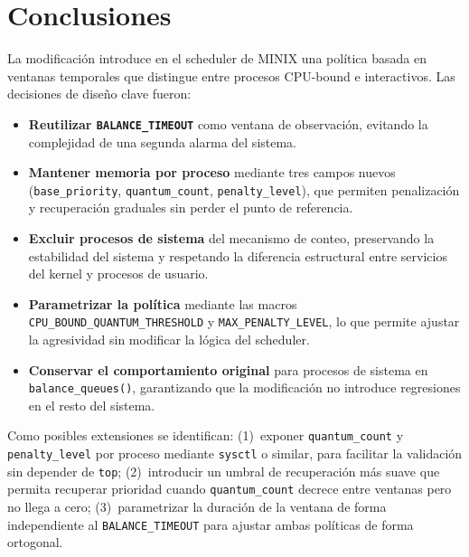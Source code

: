 \documentclass[11pt,a4paper]{article}
\begin{document}
\section{Conclusiones}

La modificaci\'on introduce en el scheduler de MINIX una pol\'itica basada en ventanas
temporales que distingue entre procesos CPU-bound e interactivos. Las decisiones de
dise\~no clave fueron:

\begin{itemize}[leftmargin=*]
  \item \textbf{Reutilizar \texttt{BALANCE\_TIMEOUT}} como ventana de observaci\'on,
        evitando la complejidad de una segunda alarma del sistema.

  \item \textbf{Mantener memoria por proceso} mediante tres campos nuevos
        (\texttt{base\_priority}, \texttt{quantum\_count}, \texttt{penalty\_level}),
        que permiten penalizaci\'on y recuperaci\'on graduales sin perder el punto de
        referencia.

  \item \textbf{Excluir procesos de sistema} del mecanismo de conteo, preservando la
        estabilidad del sistema y respetando la diferencia estructural entre servicios
        del kernel y procesos de usuario.

  \item \textbf{Parametrizar la pol\'itica} mediante las macros
        \texttt{CPU\_BOUND\_QUANTUM\_THRESHOLD} y \texttt{MAX\_PENALTY\_LEVEL},
        lo que permite ajustar la agresividad sin modificar la l\'ogica del scheduler.

  \item \textbf{Conservar el comportamiento original} para procesos de sistema en
        \texttt{balance\_queues()}, garantizando que la modificaci\'on no introduce
        regresiones en el resto del sistema.
\end{itemize}

Como posibles extensiones se identifican: (1)~exponer \texttt{quantum\_count} y
\texttt{penalty\_level} por proceso mediante \texttt{sysctl} o similar, para facilitar
la validaci\'on sin depender de \texttt{top}; (2)~introducir un umbral de recuperaci\'on
m\'as suave que permita recuperar prioridad cuando \texttt{quantum\_count} decrece entre
ventanas pero no llega a cero; (3)~parametrizar la duraci\'on de la ventana de forma
independiente al \texttt{BALANCE\_TIMEOUT} para ajustar ambas pol\'iticas de forma
ortogonal.
\end{document}
